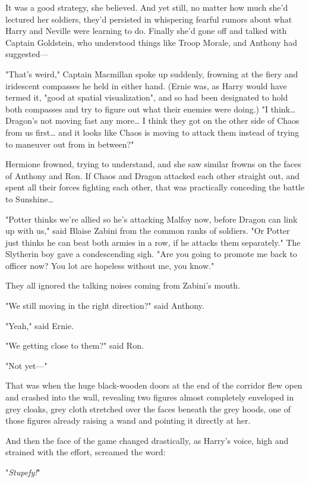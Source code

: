 It was a good strategy, she believed. And yet still, no matter how much she'd
lectured her soldiers, they'd persisted in whispering fearful rumors about what
Harry and Neville were learning to do. Finally she'd gone off and talked with
Captain Goldstein, who understood things like Troop Morale, and Anthony had
suggested---

"That's weird," Captain Macmillan spoke up suddenly, frowning at the fiery and
iridescent compasses he held in either hand. (Ernie was, as Harry would have
termed it, "good at spatial visualization", and so had been designated to hold
both compasses and try to figure out what their enemies were doing.) "I
think{\ldots} Dragon's not moving fast any more{\ldots} I think they got on the
other side of Chaos from us first{\ldots} and it looks like Chaos is moving to
attack them instead of trying to maneuver out from in between?"

Hermione frowned, trying to understand, and she saw similar frowns on the faces
of Anthony and Ron. If Chaos and Dragon attacked each other straight out, and
spent all their forces fighting each other, that was practically conceding the
battle to Sunshine{\ldots}

"Potter thinks we're allied so he's attacking Malfoy now, before Dragon can
link up with us," said Blaise Zabini from the common ranks of soldiers. "Or
Potter just thinks he can beat both armies in a row, if he attacks them
separately." The Slytherin boy gave a condescending sigh. "Are you going to
promote me back to officer now? You lot are hopeless without me, you know."

They all ignored the talking noises coming from Zabini's mouth.

"We still moving in the right direction?" said Anthony.

"Yeah," said Ernie.

"We getting close to them?" said Ron.

"Not yet---"

That was when the huge black-wooden doors at the end of the corridor flew open
and crashed into the wall, revealing two figures almost completely enveloped in
grey cloaks, grey cloth stretched over the faces beneath the grey hoods, one of
those figures already raising a wand and pointing it directly at her.

And then the face of the game changed drastically, as Harry's voice, high and
strained with the effort, screamed the word:

"\emph{Stupefy!}"

